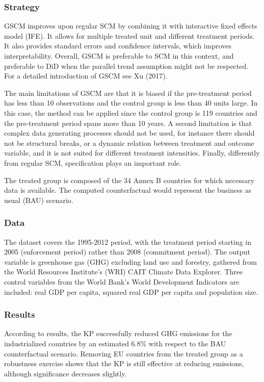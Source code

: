 \documentclass[12pt,a4paper,draft]{article}
\begin{document}
\subsubsection*{Strategy}
GSCM improves upon regular SCM by combining it with interactive fixed effects model (IFE). It 
allows for multiple treated unit and different treatment periods. It also provides standard errors 
and confidence intervals, which improves interpretability. Overall, GSCM is preferable to SCM 
in this context, and preferable to DiD when the parallel trend assumption might not be respected. 
For a detailed introduction of GSCM see Xu (2017).

The main limitations of GSCM are that it is biased if the pre-treatment period has less than 10 
observations and the control group is less than 40 units large. In this case, the method can be 
applied since the control group is 119 countries and the pre-treatment period spans more than 10 
years. A second limitation is that complex data generating processes should not be used, for instance 
there should not be structural breaks, or a dynamic relation between treatment and outcome variable, 
and it is not suited for different treatment intensities. 
Finally, differently from regular SCM, specification plays an important role.

The treated group is composed of the 34 Annex B countries for which necessary data is available. 
The computed counterfactual would represent the business as usual (BAU) scenario. 


\subsubsection*{Data}
The dataset covers the 1995-2012 period, with the treatment period starting in 2005 (enforcement 
period) rather than 2008 (commitment period). The output variable is greenhouse gas (GHG) excluding 
land use and forestry, gathered from the World Resources Institute's (WRI) CAIT Climate Data Explorer. 
Three control variables from the World Bank's World Development Indicators are included: real GDP 
per capita, squared real GDP per capita and population size.

\subsubsection*{Results}
According to results, the KP successfully reduced GHG emissions for the industrialized countries by 
an estimated 6.8\% with respect to the BAU counterfactual scenario. Removing EU countries from the 
treated group as a robustness exercise shows that the KP is still effective at reducing emissions, 
although significance decreases slightly.
\end{document}
